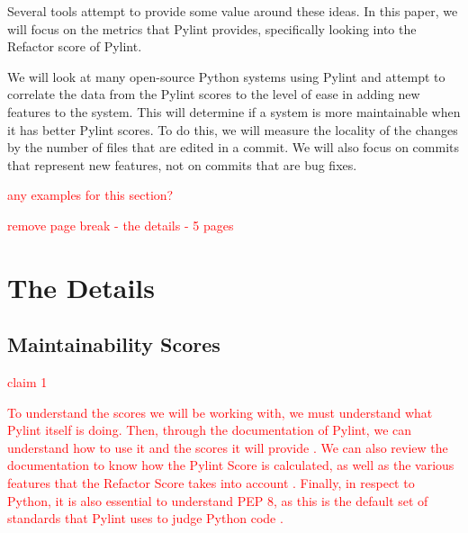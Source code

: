 \documentclass[12pt,conference]{IEEEtran}
\newcommand\todo[1]{\textcolor{red}{#1}}
\begin{document}
Several tools attempt to provide some value around these ideas. In this paper, we will focus on the metrics that Pylint provides, specifically looking into the Refactor score of Pylint.

We will look at many open-source Python systems using Pylint and attempt to correlate the data from the Pylint scores to the level of ease in adding new features to the system. This will determine if a system is more maintainable when it has better Pylint scores. To do this, we will measure the locality of the changes by the number of files that are edited in a commit. We will also focus on commits that represent new features, not on commits that are bug fixes.

\todo{any examples for this section?}

\newpage \todo{remove page break - the details - 5 pages}

\section{The Details}


\subsection{Maintainability Scores}


\todo{claim 1}

\todo{To understand the scores we will be working with, we must understand what Pylint itself is doing. Then, through the documentation of Pylint, we can understand how to use it and the scores it will provide \cite{pylint:main}. We can also review the documentation to know how the Pylint Score is calculated, as well as the various features that the Refactor Score takes into account \cite{pylint:score}. Finally, in respect to Python, it is also essential to understand PEP 8, as this is the default set of standards that Pylint uses to judge Python code \cite{pylint:pep8}.}
\end{document}
